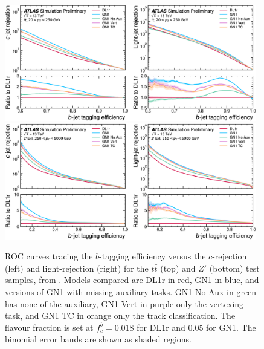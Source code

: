 \begin{figure}[h!]
  \centering
  \includegraphics[width=0.98\textwidth]{Images/FTAG/GN/GN1/ablations/ttb.png}
  \includegraphics[width=0.98\textwidth]{Images/FTAG/GN/GN1/ablations/zpb.png}
  \caption{ROC curves tracing the $b$-tagging efficiency versus the $c$-rejection (left) and light-rejection (right) for the $t\bar{t}$ (top) and $Z'$ (bottom) test samples, from \cite{ATL-PHYS-PUB-2022-027}. Models compared are DL1r in red, GN1 in blue, and versions of GN1 with missing auxiliary tasks. GN1 No Aux in green has none of the auxiliary, GN1 Vert in purple only the vertexing task, and GN1 TC in orange only the track classification. The flavour fraction is set at $f^b_c = 0.018$ for DL1r and 0.05 for GN1. The binomial error bands are shown as shaded regions.}
  \label{fig:GN1ablb}
\end{figure} 

